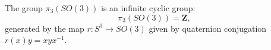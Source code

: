 The group $\pi_3(SO(3))$ is an infinite cyclic group:
$$\pi_3(SO(3)) = \mathbf{Z},$$
generated by the map $r: S^3 \to SO(3)$ given by quaternion conjugation $r(x)y = xyx^{-1}$.
